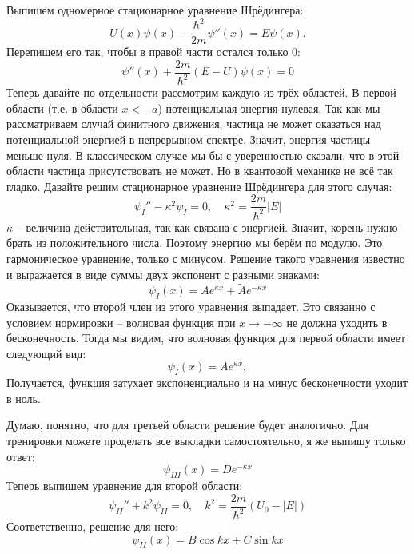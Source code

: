 Выпишем одномерное стационарное уравнение Шрёдингера:
\[
U(x) \psi(x) - \frac{\hbar^2}{2m} \psi''(x) = E \psi(x).
\]
Перепишем его так, чтобы в правой части остался только 0:
\[
\psi''(x) + \frac{2m}{\hbar^2} (E - U) \psi(x) = 0
\]
Теперь давайте по отдельности рассмотрим каждую из трёх областей. В первой области (т.е. в области $x < -a$) потенциальная энергия нулевая. Так как мы рассматриваем случай финитного движения, частица не может оказаться над потенциальной энергией в непрерывном спектре. Значит, энергия частицы меньше нуля. В классическом случае мы бы с уверенностью сказали, что в этой области частица присутствовать не может. Но в квантовой механике не всё так гладко. Давайте решим стационарное уравнение Шрёдингера для этого случая:
\[
\psi_I'' - \kappa^2 \psi_I = 0, \quad \kappa^2 = \frac{2m}{\hbar^2} |E|
\]
$\kappa$ -- величина действительная, так как связана с энергией. Значит, корень нужно брать из положительного числа. Поэтому энергию мы берём по модулю. Это гармоническое уравнение, только с минусом. Решение такого уравнения известно и выражается в виде суммы двух экспонент с разными знаками:
\[
\psi_I (x) = A e^{\kappa x} + \widetilde{A} e^{-\kappa x}
\]
Оказывается, что второй член из этого уравнения выпадает. Это связанно с условием нормировки -- волновая функция при $x \rightarrow -\infty$ не должна уходить в бесконечность. Тогда мы видим, что волновая функция для первой области имеет следующий вид:
\[
\psi_I (x) = A e^{\kappa x},
\]
Получается, функция затухает экспоненциально и на минус бесконечности уходит в ноль.

Думаю, понятно, что для третьей области решение будет аналогично. Для тренировки можете проделать все выкладки самостоятельно, я же выпишу только ответ:
\[
\psi_{III}(x) = D e^{-\kappa x}
\]
Теперь выпишем уравнение для второй области:
\[
\psi_{II}'' + k^2 \psi_{II} = 0, \quad k^2 = \frac{2m}{\hbar^2}(U_0 - |E|)
\]
Соответственно, решение для него:
\[
\psi_{II}(x) = B \cos kx + C\sin kx
\]

